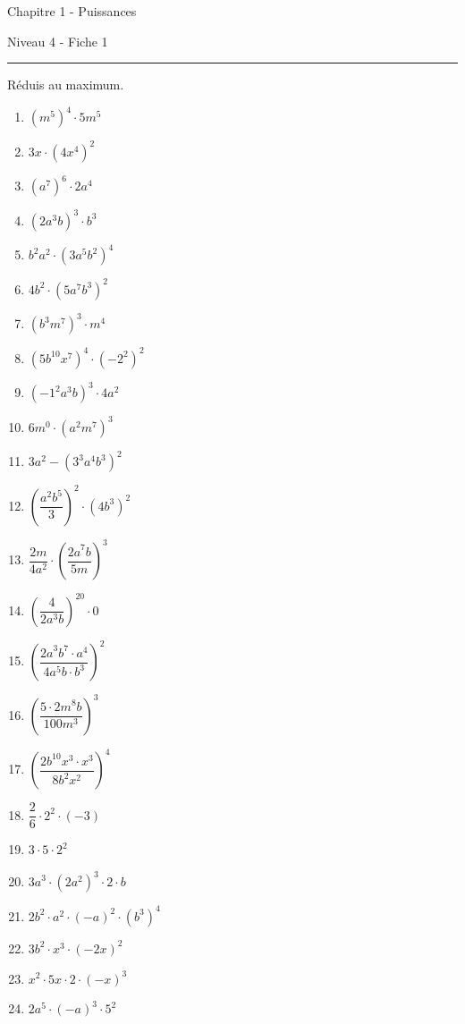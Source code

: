 \newpage
\begin{center}
  \bfseries
  \begin{Huge}
    Chapitre 1 - Puissances
  \end{Huge}
  \smallbreak
  \begin{large}
    Niveau 4  - Fiche 1
  \end{large}
  \smallbreak
  \rule[10pt]{.5\linewidth}{1 pt}
\end{center}

\setcounter{exercise}{0}

\begin{exercise}
Réduis au maximum.
\begin{enumerate}[cols=3]
  
\item \(\left( m^{5} \right)^{4} \cdot 5m^{5}\)
\item \({3x \cdot \left( 4x^{4} \right)}^{2}\)
\item \(\left( a^{7} \right)^{6} \cdot 2a^{4}\)
\item \(\left( 2a^{3}b \right)^{3} \cdot b^{3}\)
\item \({b^{2}a^{2} \cdot \left( 3a^{5}b^{2} \right)}^{4}\)
\item \({4b^{2} \cdot \left( 5a^{7}b^{3} \right)}^{2}\)
\item \(\left( b^{3}m^{7} \right)^{3} \cdot m^{4}\)
\item \(\left( 5b^{10}x^{7} \right)^{4} \cdot \left( - 2^{2} \right)^{2}\)
\item \(\left( - 1^{2}a^{3}b \right)^{3} \cdot 4a^{2}\)
\item \(6m^{0} \cdot \left( a^{2}m^{7} \right)^{3}\)
\item \(3a^{2} - \left( 3^{3}a^{4}b^{3} \right)^{2}\)
\item \(\left( \dfrac{a^{2}b^{5}}{3} \right)^{2} \cdot \left( 4b^{3} \right)^{2}\)
\item \(\dfrac{2m}{4a^{2}} \cdot \left( \dfrac{{2a}^{7}b}{5m} \right)^{3}\)
\item \(\left( \dfrac{4}{2a^{3}b} \right)^{20} \cdot 0\)
\item \(\left( \dfrac{{2a}^{3}b^{7} \cdot a^{4}}{4a^{5}b \cdot b^{3}} \right)^{2}\)
\item \(\left( \dfrac{{5 \cdot 2m}^{8}b}{100m^{3}} \right)^{3}\)
\item \(\left( \dfrac{{2b}^{10}x^{3} \cdot x^{3}}{8b^{2}x^{2}} \right)^{4}\)
\item \(\dfrac{2}{6} \cdot 2^{2} \cdot ( - 3)\)
\item \(3 \cdot 5 \cdot 2^{2}\)
\item \({3a}^{3} \cdot \left( 2a^{2} \right)^{3} \cdot 2 \cdot b\)
\item \(2b^{2} \cdot a^{2} \cdot ( - a)^{2} \cdot \left( b^{3} \right)^{4}\)
\item \({3b}^{2} \cdot x^{3} \cdot ( - 2x)^{2}\)
\item \(x^{2} \cdot 5x \cdot 2 \cdot ( - x)^{3}\)
\item \(2a^{5} \cdot ( - a)^{3} \cdot 5^{2}\)


\end{enumerate}
\end{exercise}


